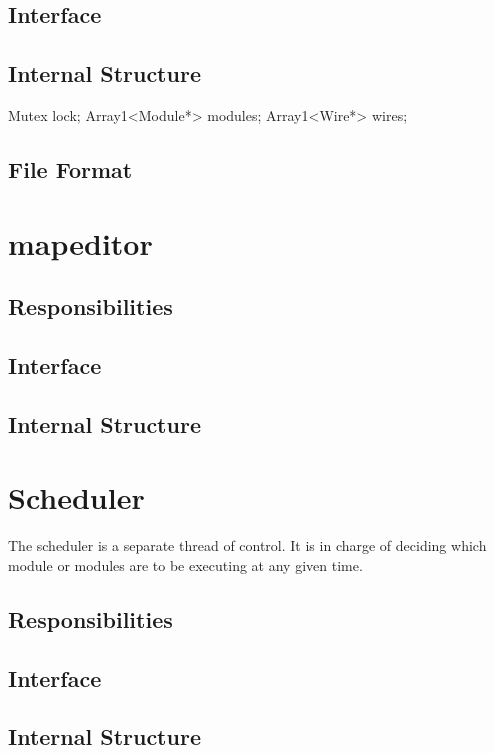 \subsection{Interface}

\subsection{Internal Structure}
Mutex lock;
Array1<Module*> modules;
Array1<Wire*> wires;

\subsection{File Format}


\section{mapeditor}

\subsection{Responsibilities}

\subsection{Interface}

\subsection{Internal Structure}


\section{Scheduler}

The scheduler is a separate thread of control.  It is in charge of
deciding which module or modules are to be executing at any given
time.

\subsection{Responsibilities}

\subsection{Interface}

\subsection{Internal Structure}

